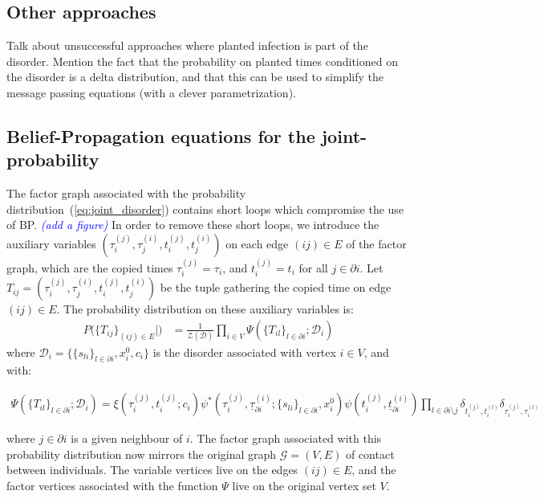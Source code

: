 \documentclass[a4paper, amsfonts, amssymb, amsmath, reprint, showkeys, nofootinbib, twoside, floatfix, pre,superscriptaddress]{revtex4-2}
\begin{document}
\subsection{Other approaches}
Talk about unsuccessful approaches where planted infection is part of the disorder.
Mention the fact that the probability on planted times conditioned on the disorder is a delta distribution, and that this can be used to simplify the message passing equations (with a clever parametrization).

\subsection{Belief-Propagation equations for the joint-probability}
The factor graph associated with the probability distribution~(\ref{eq:joint_disorder}) contains short loops which compromise the use of BP. \textcolor{blue}{\it (add a figure)} 
In order to remove these short loops, we introduce the auxiliary variables $(\tau_i^{(j)},\tau_j^{(i)},t_i^{(j)},t_j^{(i)})$ on each edge $(ij)\in E$ of the factor graph, which are the copied times $\tau_i^{(j)}=\tau_i$, and $t_i^{(j)}=t_i$ for all $j\in\partial i$.
Let $T_{ij}=(\tau_i^{(j)},\tau_j^{(i)},t_i^{(j)},t_j^{(i)})$ be the tuple gathering the copied time on edge $(ij)\in E$.
The probability distribution on these auxiliary variables is:
\begin{align}
\label{eq:prob_auxiliary}
	P(\{T_{ij}\}_{(ij)\in E}|\mathcal) &= \frac{1}{\mathcal{Z}(\mathcal{D})}\prod_{i\in V}\Psi(\{T_{il}\}_{l\in\partial i};\mathcal{D}_i) 
\end{align}
where $\mathcal{D}_i=\{\{s_{li}\}_{l\in\partial i},x_i^0, c_i\}$ is the disorder associated with vertex $i\in V$, and with:
\begin{widetext}
\begin{align}
	\Psi(\{T_{il}\}_{l\in\partial i};\mathcal{D}_i) = \xi(\tau_i^{(j)},t_i^{(j)};c_i)\psi^*(\tau_i^{(j)},\underline{\tau}_{\partial i}^{(i)};\{s_{li}\}_{l\in\partial i},x_i^0)\psi(t_i^{(j)},\underline{t}_{\partial i}^{(i)})\prod_{l\in\partial i\setminus j}\delta_{t_i^{(j)},t_i^{(l)}}\delta_{\tau_i^{(j)},\tau_i^{(l)}}
\end{align}
\end{widetext}
where $j\in\partial i$ is a given neighbour of $i$. The factor graph associated with this probability distribution now mirrors the original graph $\mathcal{G}=(V,E)$ of contact between individuals.
The variable vertices live on the edges $(ij)\in E$, and the factor vertices associated with the function $\Psi$ live on the original vertex set $V$. 
\end{document}
